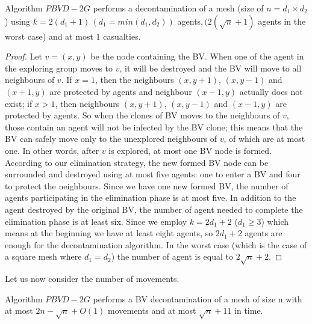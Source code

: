 \begin{theorem}
Algorithm $PBVD-2G$  performs a decontamination of a mesh (size of $n=d_1\times d_2$) using $k=2(d_1+1)\,(d_1=min(d_1, d_2))$ agents,\,$(2(\sqrt{n}+1)$ agents in the worst case) and at most 1 casualties. 
\end{theorem}
\begin{proof}
Let $v=(x, y)$ be the node containing the BV. When one of the agent in the exploring group moves to $v$, it will be destroyed and the BV will move to all neighbours of $v$. If $x=1$, then the neighbours $(x, y+1)$, $(x, y-1)$ and $(x+1, y)$ are protected by agents and neighbour $(x-1, y)$ actually does not exist; if $x>1$, then neighbours $(x, y+1)$, $(x, y-1)$ and $(x-1, y)$ are protected by agents. So when the clones of BV moves to the neighbours of $v$, those contain an agent will not be infected by the BV clone; this means that the BV can safely move only to the unexplored neighbours of $v$, of which are at most one. In other words, after $v$ is explored, at most one BV node is formed. According to our elimination strategy, the new formed BV node can be surrounded and destroyed using at most five agents: one to enter a BV and four to protect the neighbours. Since we have one new formed BV, the number of agents participating in the elimination phase is at most five. In addition to the agent destroyed by the original BV, the number of agent needed to complete the elimination phase is at least six. Since we employ $k=2d_1+2$ ($d_1\geq 3$) which means at the beginning we have at least eight agents, so $2d_1+2$ agents are enough for the decontamination algorithm. In the worst case (which is the case of a  square mesh where $d_1=d_2$) the number of agent is equal to $2\sqrt{n}+2$.
\end{proof}
Let us now consider the number of movements.
\begin{theorem}
Algorithm $PBVD-2G$  performs a BV decontamination of a mesh of size n with at most $2n-\sqrt{n}+O(1)$ movements and at most $\sqrt{n}+11$ in time.
\end{theorem}

